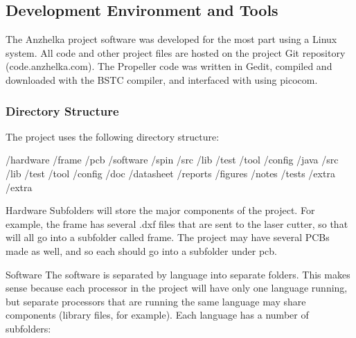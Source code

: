 \documentclass{article}
\numberwithin{equation}{section} %
\begin{document}
\subsection{Development Environment and Tools}

The Anzhelka project software was developed for the most part using a Linux system. All code and other project files are hosted on the project Git repository (code.anzhelka.com). The Propeller code was written in Gedit, compiled and downloaded with the BSTC compiler, and interfaced with using picocom.

\subsubsection{Directory Structure}

The project uses the following directory structure:

 /hardware 
    /frame 
    /pcb 
 /software 
    /spin 
       /src 
       /lib 
       /test 
       /tool 
       /config 
    /java 
       /src 
       /lib 
       /test 
       /tool 
       /config 
 /doc 
    /datasheet 
    /reports 
    /figures 
    /notes 
    /tests 
    /extra 
 /extra 
 
Hardware
Subfolders will store the major components of the project. For example, the frame has several .dxf files that are sent to the laser cutter, so that will all go into a subfolder called frame. The project may have several PCBs made as well, and so each should go into a subfolder under pcb. 

Software 
The software is separated by language into separate folders. This makes sense because each processor in the project will have only one language running, but separate processors that are running the same language may share components (library files, for example). Each language has a number of subfolders: 
\end{document}
